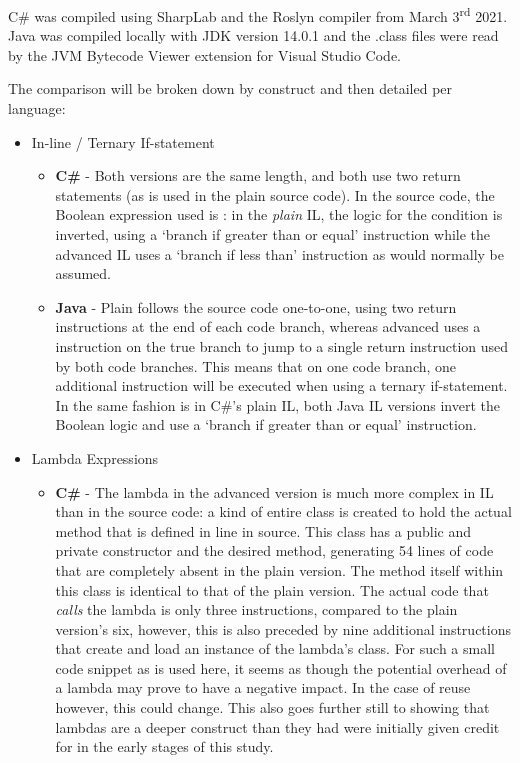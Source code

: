 \documentclass{article}
\begin{document}
        C\# was compiled using SharpLab and the Roslyn compiler from March 3\textsuperscript{rd} 2021. Java was compiled locally with JDK version 14.0.1 and the .class files were read by the JVM Bytecode Viewer extension for Visual Studio Code.

        The comparison will be broken down by construct and then detailed per language:

        \begin{itemize}
            \item In-line / Ternary If-statement
            \begin{itemize}
                \item \textbf{C\#} - Both versions are the same length, and both use two return statements (as is used in the plain source code). In the source code, the Boolean expression used is : in the \emph{plain} IL, the logic for the condition is inverted, using a `branch if greater than or equal' instruction while the advanced IL uses a `branch if less than' instruction as would normally be assumed.
                \item \textbf{Java} - Plain follows the source code one-to-one, using two return instructions at the end of each code branch, whereas advanced uses a  instruction on the true branch to jump to a single return instruction used by both code branches. This means that on one code branch, one additional instruction will be executed when using a ternary if-statement. In the same fashion is in C\#'s plain IL, both Java IL versions invert the Boolean logic and use a `branch if greater than or equal' instruction.
            \end{itemize}
            \item Lambda Expressions
            \begin{itemize}
                \item \textbf{C\#} - The lambda in the advanced version is much more complex in IL than in the source code: a kind of entire class is created to hold the actual method that is defined in line in source. This class has a public and private constructor and the desired method, generating 54 lines of code that are completely absent in the plain version. The method itself within this class is identical to that of the plain version. The actual code that \emph{calls} the lambda is only three instructions, compared to the plain version's six, however, this is also preceded by nine additional instructions that create and load an instance of the lambda's class. For such a small code snippet as is used here, it seems as though the potential overhead of a lambda may prove to have a negative impact. In the case of reuse however, this could change. This also goes further still to showing that lambdas are a deeper construct than they had were initially given credit for in the early stages of this study.

\end{itemize}
\end{itemize}
\end{document}
